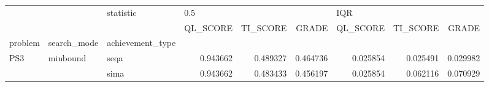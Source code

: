 \begin{tabular}{lllrrrrrr}
\toprule
    &          & statistic & \multicolumn{3}{l}{0.5} & \multicolumn{3}{l}{IQR} \\
    &          & {} &  QL\_SCORE &  TI\_SCORE &     GRADE &  QL\_SCORE &  TI\_SCORE &     GRADE \\
problem & search\_mode & achievement\_type &           &           &           &           &           &           \\
\midrule
PS3 & minbound & seqa &  0.943662 &  0.489327 &  0.464736 &  0.025854 &  0.025491 &  0.029982 \\
    &          & sima &  0.943662 &  0.483433 &  0.456197 &  0.025854 &  0.062116 &  0.070929 \\
\bottomrule
\end{tabular}
